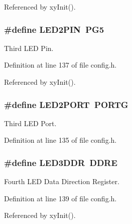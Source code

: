 Referenced by xy\-Init().

\hypertarget{group__config_ga50070e632cb68d11f627c5ab60f88683}{
\subsubsection[{L\-E\-D2\-P\-I\-N}]{\setlength{\rightskip}{0pt plus 5cm}\#define L\-E\-D2\-P\-I\-N~P\-G5}}\label{group__config_ga50070e632cb68d11f627c5ab60f88683}


Third L\-E\-D Pin. 



Definition at line 137 of file config.\-h.



Referenced by xy\-Init().

\hypertarget{group__config_ga4b6e8cddebfbc6f1f5132eb93b92d60f}{
\subsubsection[{L\-E\-D2\-P\-O\-R\-T}]{\setlength{\rightskip}{0pt plus 5cm}\#define L\-E\-D2\-P\-O\-R\-T~P\-O\-R\-T\-G}}\label{group__config_ga4b6e8cddebfbc6f1f5132eb93b92d60f}


Third L\-E\-D Port. 



Definition at line 135 of file config.\-h.

\hypertarget{group__config_ga09535652dd0ca340b20840c848cb6093}{
\subsubsection[{L\-E\-D3\-D\-D\-R}]{\setlength{\rightskip}{0pt plus 5cm}\#define L\-E\-D3\-D\-D\-R~D\-D\-R\-E}}\label{group__config_ga09535652dd0ca340b20840c848cb6093}


Fourth L\-E\-D Data Direction Register. 



Definition at line 139 of file config.\-h.



Referenced by xy\-Init().

